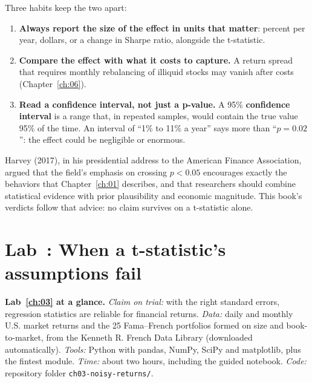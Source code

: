 Three habits keep the two apart:

\begin{enumerate}
  \item \textbf{Always report the size of the effect in units that matter}: percent per year, dollars, or a change in Sharpe ratio, alongside the t-statistic.
  \item \textbf{Compare the effect with what it costs to capture.} A return spread that requires monthly rebalancing of illiquid stocks may vanish after costs (Chapter~\ref{ch:06}).
  \item \textbf{Read a confidence interval, not just a p-value.} A 95\% \textbf{confidence interval} is a range that, in repeated samples, would contain the true value 95\% of the time. An interval of ``1\% to 11\% a year'' says more than ``$p = 0.02$'': the effect could be negligible or enormous.
\end{enumerate}

Harvey (2017), in his presidential address to the American Finance Association, argued that the field's emphasis on crossing $p < 0.05$ encourages exactly the behaviors that Chapter~\ref{ch:01} describes, and that researchers should combine statistical evidence with prior plausibility and economic magnitude. This book's verdicts follow that advice: no claim survives on a t-statistic alone.

\section{Lab~\thechapter: When a t-statistic's assumptions fail}
\label{sec:03-lab}

\begin{callout}
\textbf{Lab~\ref{ch:03} at a glance.} \emph{Claim on trial:} with the right standard errors, regression statistics are reliable for financial returns. \emph{Data:} daily and monthly U.S. market returns and the 25 Fama--French portfolios formed on size and book-to-market, from the Kenneth R. French Data Library (downloaded automatically). \emph{Tools:} Python with pandas, NumPy, SciPy and matplotlib, plus the fintest module. \emph{Time:} about two hours, including the guided notebook. \emph{Code:} repository folder \texttt{ch03-noisy-returns/}.
\end{callout}

